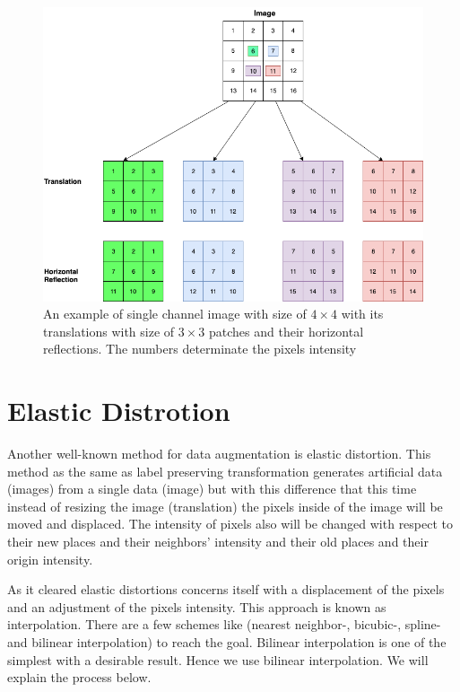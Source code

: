 \begin{figure}
  \centering
  \label{fig:label-preserving-trasformation}
  \includegraphics[width=1\textwidth]{fig/label-preserving-transformation}
  \caption{An example of single channel image with size of $4\times4$ with its translations with size of $3\times3$ patches and their horizontal reflections. The numbers determinate the pixels intensity}
\end{figure}


\section{Elastic Distrotion}
\label{tit:elastic-distrotion}
Another well-known method for data augmentation is elastic distortion. This method as the same as label preserving transformation generates artificial data (images) from a single data (image) but with
this difference that this time instead of resizing the image (translation) the pixels inside of the image will be moved and displaced. The intensity of pixels also will be changed with respect to
their new places and their neighbors' intensity and their old places and their origin intensity.

As it cleared elastic distortions concerns itself with a displacement of the pixels and an adjustment of the pixels intensity. This approach is known as interpolation. There are a few schemes like
(nearest neighbor-, bicubic-,  spline- and bilinear interpolation) to reach the goal. Bilinear interpolation is one of the simplest with a desirable result. Hence we use bilinear interpolation. We
will explain the process below.

